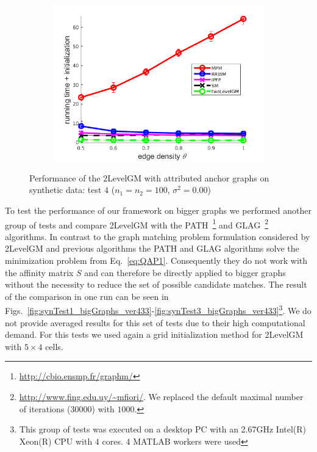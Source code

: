 \begin{figure}[h]
\begin{subfigure}[b]{0.33\textwidth}
			\includegraphics[scale=0.25]{"chapter3/fig/SyntheticTest/descr/Results_v4.3.3/Test4/time_summary_avg10t"} 
		\end{subfigure} 	
	\caption[Performance of the 2LevelGM with attributed anchor graphs on synthetic data (test $4$)]{Performance of the 2LevelGM with attributed anchor graphs on synthetic data: test $4$ ($n_1=n_2=100$, $\sigma^2=0.00$)}
	\label{fig:synTest4_descr_ver433}
\end{figure}

To test the performance of our framework on bigger graphs we performed another group of tests and compare 2LevelGM with the PATH~\cite{Zazlavskiy2008_PATH}\footnote{\url{http://cbio.ensmp.fr/graphm/}} and GLAG~\cite{Fiori2013_GLAG}\footnote{\url{http://www.fing.edu.uy/~mfiori/}. We replaced the default maximal number of iterations ($30000$) with $1000$.} algorithms. In contrast to the graph matching problem formulation considered by 2LevelGM and previous algorithms the PATH and GLAG algorithms solve the minimization problem from Eq.~\eqref{eq:QAP1}. Consequently they do not work with the affinity matrix $S$ and can therefore be directly applied to bigger graphs without the necessity to reduce the set of possible candidate matches. The result of the comparison in one run can be seen in Figs.~\ref{fig:synTest1_bigGraphs_ver433}-\ref{fig:synTest3_bigGraphs_ver433}\footnote{This group of tests was executed on a desktop PC with an 2.67GHz Intel(R) Xeon(R) CPU with $4$ cores. $4$ MATLAB workers were used}. We do not provide averaged results for this set of tests due to their high computational demand. For this tests we used again a grid initialization method for 2LevelGM with $5\times 4$ cells.
\FloatBarrier

